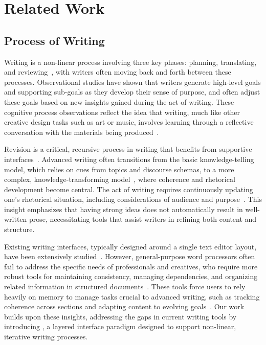 \section{Related Work}
\subsection{Process of Writing}
Writing is a non-linear process involving three key phases: planning, translating, and reviewing~\cite{hayes1980identifying}, with writers often moving back and forth between these processes. Observational studies have shown that writers generate high-level goals and supporting sub-goals as they develop their sense of purpose, and often adjust these goals based on new insights gained during the act of writing. These cognitive process observations reflect the idea that writing, much like other creative design tasks such as art or music, involves learning through a reflective conversation with the materials being produced~\cite{bamberger1983learning}.

Revision is a critical, recursive process in writing that benefits from supportive interfaces~\cite{fitzgerald1987research, seow2002writing}. Advanced writing often transitions from the basic knowledge-telling model, which relies on cues from topics and discourse schemas, to a more complex, knowledge-transforming model~\cite{bereiter1987psychology}, where coherence and rhetorical development become central. The act of writing requires continuously updating one's rhetorical situation, including considerations of audience and purpose~\cite{flower1980cognition}. This insight emphasizes that having strong ideas does not automatically result in well-written prose, necessitating tools that assist writers in refining both content and structure.

Existing writing interfaces, typically designed around a single text editor layout, have been extensively studied~\cite{whiteside1982people, egan1982learner}. However, general-purpose word processors often fail to address the specific needs of professionals and creatives, who require more robust tools for maintaining consistency, managing dependencies, and organizing related information in structured documents~\cite{han2020designing}. These tools force users to rely heavily on memory to manage tasks crucial to advanced writing, such as tracking coherence across sections and adapting content to evolving goals~\cite{han2020textlets, han2020designing}. Our work builds upon these insights, addressing the gaps in current writing tools by introducing \system, a layered interface paradigm designed to support non-linear, iterative writing processes. 



